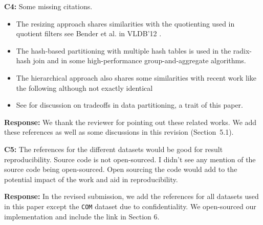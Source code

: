 \begin{shaded}
	\noindent\textbf{C4:} Some missing citations.
	\begin{itemize}[noitemsep]
		\item The resizing approach shares similarities with the quotienting used in quotient filters see Bender et al. in VLDB'12 \cite{bender2012don}.  
		\item The hash-based partitioning with multiple hash tables is used in the radix-hash join \cite{boncz1999database} and in some high-performance group-and-aggregate algorithms.  
		\item The hierarchical approach also shares some similarities with recent work like the following although not exactly identical \cite{zuo2018write}
		\item See \cite{zhang2019data} for discussion on tradeoffs in data partitioning, a trait of this paper.
	\end{itemize} 	
\end{shaded}
%
\noindent\textbf{Response:} 
We thank the reviewer for pointing out these related works. We add these references as well as some discussions in this revision (Section~5.1). 

\begin{shaded}
	\noindent\textbf{C5:} 
	The references for the different datasets would be good for result reproducibility.
	Source code is not open-sourced.  I didn't see any mention of the source code being open-sourced.  Open sourcing the code would add to the potential impact of the work and aid in reproducibility.
\end{shaded}
%
\noindent\textbf{Response:} 
In the revised submission, we add the references for all datasets used in this paper except the {\tt COM} dataset due to confidentiality. We open-sourced our implementation and include the link in Section 6.